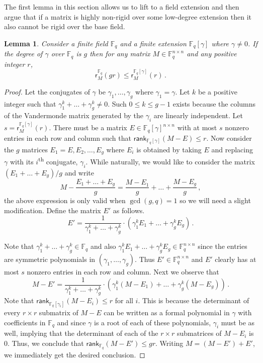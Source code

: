 \documentclass[11pt]{article}
\numberwithin{equation}{section}
\newtheorem{lemma}[theorem]{Lemma}
\theoremstyle{definition}
\theoremstyle{plain}
\theoremstyle{definition}
\newcommand\F{{\mathbb{F}}}
\newcommand\rank{\textsf{rank}}
\newcommand{\ts}{\textsuperscript}
\begin{document}
The first lemma in this section allows us to lift to a field extension and then argue that if a matrix is highly non-rigid over some low-degree extension then it also cannot be rigid over the base field.

\begin{lemma}\label{conjugates}
Consider a finite field $\F_q$ and
%
a finite extension
$\F_q[\gamma]$ where $\gamma \neq 0$.  If the degree of
$\gamma$ over $\F_q$ 
is $g$ then for any matrix $M \in \F_{q}^{n \times n}$
and any positive integer $r$,
\[
\textsf{r}^{\F_q}_M(gr) \leq \textsf{r}^{\F_q[\gamma]}_M(r) \,.
\]
\end{lemma}
\begin{proof}
  Let the conjugates of $\gamma$ be $\gamma_1, \dots , \gamma_g$ where $\gamma_1 = \gamma$.  Let $k$ be a positive integer such that $\gamma_1^k + \dots + \gamma_g^k \neq 0$.
%
Such $0\le k\le g-1$ exists because the columns of the Vandermonde matrix
generated by the $\gamma_i$ are linearly independent. %
Let $s = \textsf{r}^{\F_q[\gamma]}_M(r)$.  There must be a matrix $E \in \F_q[\gamma]^{n \times n}$ with at most $s$ nonzero entries in each row and column such that $\rank_{\F_q[\gamma]}(M - E) \leq r$.  Now consider the $g$ matrices $E_1 = E, E_2, \dots , E_g$ where $E_i$ is obtained by taking $E$ and replacing $\gamma$ with its $i$\ts{th} conjugate, $\gamma_i$.  While naturally, we would like to consider the matrix $(E_1 + \dots + E_g)/g$ and write
\[
M  - \frac{E_1 + \dots + E_g}{g} = \frac{M - E_1}{g} + \dots + \frac{M - E_g}{g} \,,
\]
the above expression is only valid when $\gcd(g,q) = 1$ so we will need a slight modification.  Define the matrix $E'$ as follows.
%
%
%
%
%
%
\[
E' = \frac{1}{\gamma_1^k + \dots + \gamma_g^k} \cdot
\left(\gamma_1^k E_1 + \dots + \gamma_g^kE_g \right)\,.
\]

Note that $\gamma_1^k + \dots + \gamma_g^k \in \F_q$ and also $\gamma_1^kE_1 + \dots + \gamma_g^kE_g \in \F_{q}^{n \times n}$ since the entries are symmetric polynomials in $(\gamma_1, \dots , \gamma_g)$.  Thus $E' \in \F_{q}^{n \times n}$ and $E'$ clearly has at most $s$ nonzero entries in each row and column.  Next we observe that %
\[
M -  E'= \frac{1}{\gamma_1^k + \dots + \gamma_g^k}\cdot
 \left( \gamma_1^k(M - E_1) + \dots + \gamma_g^k(M - E_g)\right) \,.
\]
Note that $\rank_{\F_q[\gamma_i]}(M - E_i) \leq r$ for all $i$.  This is because the determinant of every $r \times r$ submatrix of $M - E$ can be written as a formal polynomial in $\gamma$ with coefficients in $\F_q$ and since $\gamma$ is a root of each of these polynomials, $\gamma_i$ must be as well, implying that the determinant of each of the $r \times r$ submatrices of $M - E_i$ is $0$.  Thus, we conclude that $\rank_{\F_q}(M - E') \leq gr$.  Writing $M = (M - E') + E'$, we immediately get the desired conclusion.
\end{proof}
%
\end{document}
